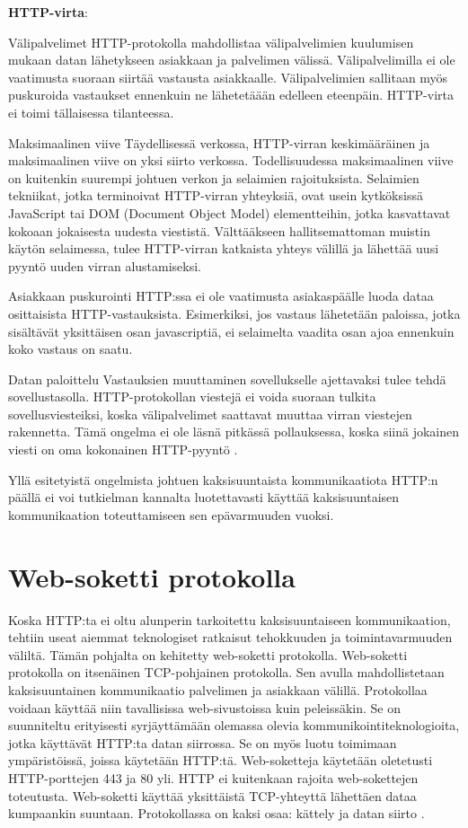 \documentclass[utf8]{gradu3}
\begin{document}
\textbf{HTTP-virta}:
\begin{desclist}
\item[Välipalvelimet] HTTP-protokolla mahdollistaa välipalvelimien kuulumisen mukaan datan lähetykseen asiakkaan ja palvelimen välissä. Välipalvelimilla ei ole vaatimusta suoraan siirtää vastausta asiakkaalle. Välipalvelimien sallitaan myös puskuroida vastaukset ennenkuin ne lähetetäään edelleen eteenpäin. HTTP-virta ei toimi tällaisessa tilanteessa.
\item[Maksimaalinen viive] Täydellisessä verkossa, HTTP-virran keskimääräinen ja maksimaalinen viive on yksi siirto verkossa. Todellisuudessa maksimaalinen viive on kuitenkin suurempi johtuen verkon ja selaimien rajoituksista. Selaimien tekniikat, jotka terminoivat HTTP-virran yhteyksiä, ovat usein kytköksissä JavaScript tai DOM (Document Object Model) elementteihin, jotka kasvattavat kokoaan jokaisesta uudesta viestistä. Välttääkseen hallitsemattoman muistin käytön selaimessa, tulee HTTP-virran katkaista yhteys välillä ja lähettää uusi pyyntö uuden virran alustamiseksi.
\item[Asiakkaan puskurointi] HTTP:ssa ei ole vaatimusta asiakaspäälle luoda dataa osittaisista  HTTP-vastauksista. Esimerkiksi, jos vastaus lähetetään paloissa, jotka sisältävät yksittäisen osan javascriptiä, ei selaimelta vaadita osan ajoa ennenkuin koko vastaus on saatu.
\item[Datan paloittelu] Vastauksien muuttaminen sovellukselle ajettavaksi tulee tehdä sovellustasolla. HTTP-protokollan viestejä ei voida suoraan tulkita sovellusviesteiksi, koska välipalvelimet saattavat muuttaa virran viestejen rakennetta. Tämä ongelma ei ole läsnä pitkässä pollauksessa, koska siinä jokainen viesti on oma kokonainen HTTP-pyyntö \parencite[s. 2]{long_polling}. 
\end{desclist}

Yllä esitetyistä ongelmista johtuen kaksisuuntaista kommunikaatiota HTTP:n päällä ei voi tutkielman kannalta luotettavasti käyttää kaksisuuntaisen kommunikaation toteuttamiseen sen epävarmuuden vuoksi.

\section{Web-soketti protokolla}
Koska HTTP:ta ei oltu alunperin tarkoitettu kaksisuuntaiseen kommunikaation, tehtiin useat aiemmat teknologiset ratkaisut tehokkuuden ja toimintavarmuuden väliltä. Tämän pohjalta on kehitetty web-soketti protokolla. Web-soketti protokolla on itsenäinen TCP-pohjainen protokolla. Sen avulla mahdollistetaan kaksisuuntainen kommunikaatio palvelimen ja asiakkaan välillä. Protokollaa voidaan käyttää niin tavallisissa web-sivustoissa kuin peleissäkin.  Se on suunniteltu erityisesti syrjäyttämään olemassa olevia kommunikointiteknologioita, jotka käyttävät HTTP:ta datan siirrossa. Se on myös luotu toimimaan ympäristöissä, joissa käytetään HTTP:tä. Web-soketteja käytetään oletetusti  HTTP-porttejen 443 ja 80 yli. HTTP ei kuitenkaan rajoita web-sokettejen toteutusta.  Web-soketti käyttää yksittäistä TCP-yhteyttä lähettäen dataa kumpaankin suuntaan. Protokollassa on kaksi osaa: kättely ja datan siirto \parencite[s. 1.1]{websocket}.
\end{document}
